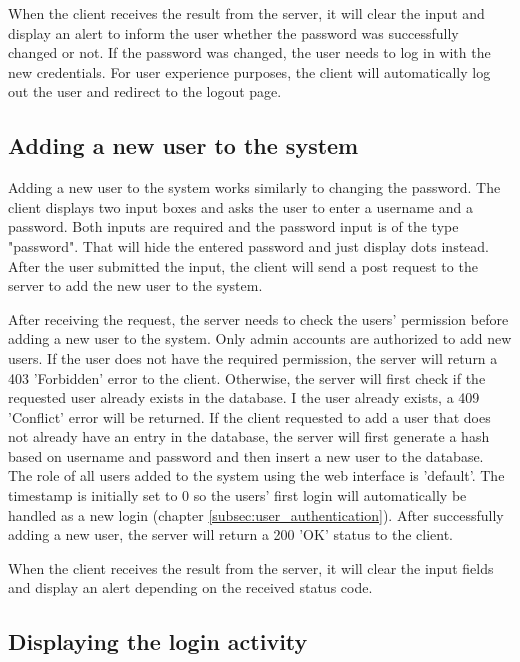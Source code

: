 When the client receives the result from the server, it will clear the input and display an alert to inform the user whether the password was successfully changed or not. If the password was changed, the user needs to log in with the new credentials. For user experience purposes, the client will automatically log out the user and redirect to the logout page.



\subsection{Adding a new user to the system}
\label{subsec:adding_a_new_user_to_the_system}

Adding a new user to the system works similarly to changing the password. The client displays two input boxes and asks the user to enter a username and a password. Both inputs are required and the password input is of the type "password". That will hide the entered password and just display dots instead. After the user submitted the input, the client will send a post request to the server to add the new user to the system.

After receiving the request, the server needs to check the users' permission before adding a new user to the system. Only admin accounts are authorized to add new users. If the user does not have the required permission, the server will return a 403 'Forbidden' error to the client. Otherwise, the server will first check if the requested user already exists in the database.  I the user already exists, a 409 'Conflict' error will be returned. If the client requested to add a user that does not already have an entry in the database,  the server will first generate a hash based on username and password and then insert a new user to the database. The role of all users added to the system using the web interface is 'default'. The timestamp is initially set to 0 so the users' first login will automatically be handled as a new login (chapter \ref{subsec:user_authentication}). After successfully adding a new user, the server will return a 200 'OK' status to the client.

When the client receives the result from the server, it will clear the input fields and display an alert depending on the received status code.



\subsection{Displaying the login activity}
\label{subsec:displaying_the_login_activity}

